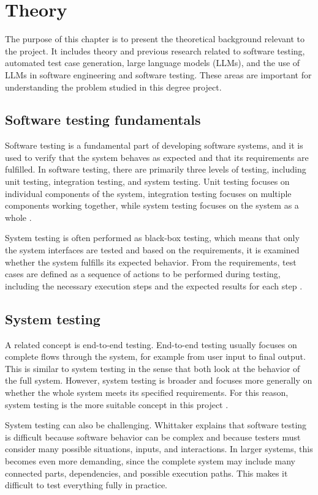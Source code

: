 \documentclass[a4paper,12pt]{article}
\begin{document}
\newpage

\section{Theory}
The purpose of this chapter is to present the theoretical background relevant to the project. It includes theory and previous research related to software testing, automated test case generation, large language models (LLMs), and the use of LLMs in software engineering and software testing. These areas are important for understanding the problem studied in this degree project.

\subsection{Software testing fundamentals}
Software testing is a fundamental part of developing software systems, and it is used to verify that the system behaves as expected and that its requirements are fulfilled. In software testing, there are primarily three levels of testing, including unit testing, integration testing, and system testing. Unit testing focuses on individual components of the system, integration testing focuses on multiple components working together, while system testing focuses on the system as a whole \cite{testing_study_2020}.

System testing is often performed as black-box testing, which means that only the system interfaces are tested and based on the requirements, it is examined whether the system fulfills its expected behavior. From the requirements, test cases are defined as a sequence of actions to be performed during testing, including the necessary execution steps and the expected results for each step \cite{testing_study_2020, luo2001softwaretesting}.

\subsection{System testing}
A related concept is end-to-end testing. End-to-end testing usually focuses on complete flows through the system, for example from user input to final output. This is similar to system testing in the sense that both look at the behavior of the full system. However, system testing is broader and focuses more generally on whether the whole system meets its specified requirements. For this reason, system testing is the more suitable concept in this project \cite{istqbE2E}.

System testing can also be challenging. Whittaker \cite{whittaker2002software} explains that software testing is difficult because software behavior can be complex and because testers must consider many possible situations, inputs, and interactions. In larger systems, this becomes even more demanding, since the complete system may include many connected parts, dependencies, and possible execution paths. This makes it difficult to test everything fully in practice. 
\end{document}
